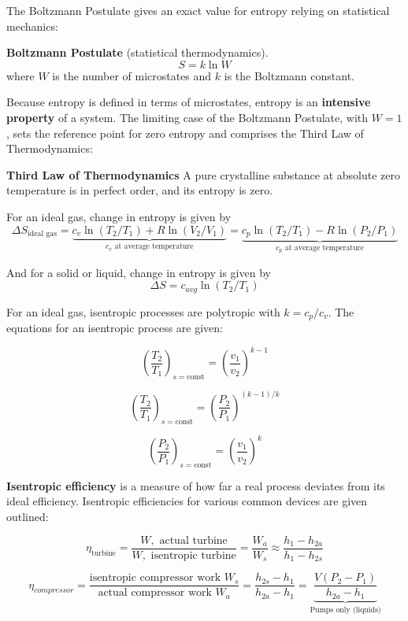 The Boltzmann Postulate gives an exact value for entropy relying on statistical mechanics: \begin{shaded}
\textbf{Boltzmann Postulate} (statistical thermodynamics).
 \[S = k\ln W\] where $W$ is the number of microstates and $k$ is the Boltzmann constant.
\end{shaded}

Because entropy is defined in terms of microstates, entropy is an \textbf{intensive property} of a system. The limiting case of the Boltzmann Postulate, with $W=1$, sets the reference point for zero entropy and comprises the Third Law of Thermodynamics:

\begin{shaded}
    \textbf{Third Law of Thermodynamics} A pure crystalline substance at absolute zero temperature is in perfect order, and its entropy is zero.
\end{shaded}

For an ideal gas, change in entropy is given by \[\Delta S_\text{ideal gas} = \underbrace{c_v \ln (T_2 / T_1) + R\ln (V_2 / V_1)}_{c_v\text{ at average temperature}} =\underbrace{c_p\ln (T_2 / T_1) - R\ln (P_2 / P_1)}_{c_p\text{ at average temperature}}\]

And for a solid or liquid, change in entropy is given by \[\Delta S = c_{avg}\ln(T_2/T_1)\]

For an ideal gas, isentropic processes are polytropic with $k=c_p/c_v$. The equations for an isentropic process are given:

\[\left(\frac{T_2}{T_1}\right)_{s=\text{const}} = \left(\frac{v_1}{v_2}\right)^{k-1}\]

\[\left(\frac{T_2}{T_1}\right)_{s=\text{const}} = \left(\frac{P_2}{P_1}\right)^{(k-1)/k}\]

\[\left(\frac{P_2}{P_1}\right)_{s=\text{const}} = \left(\frac{v_1}{v_2}\right)^{k}\]

\textbf{Isentropic efficiency} is a measure of how far a real process deviates from its ideal efficiency. Isentropic efficiencies for various common devices are given outlined:

\[\eta_{\text{turbine}} = \frac{W,\text{ actual turbine}}{W,\text{ isentropic turbine}} = \frac{W_a}{W_s} \approx \frac{h_1-h_{2a}}{h_1-h_{2s}}\]

\[\eta_{compressor} = \frac{\text{isentropic compressor work }W_s}{\text{actual compressor work }W_a} = \frac{h_{2s}-h_1}{h_{2a}-h_1} = \underbrace{\frac{V(P_2-P_1)}{h_{2a}-h_1}}_\text{Pumps only (liquids)} 
\]


